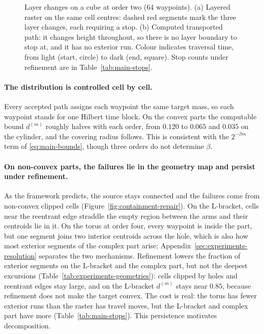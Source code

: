 \begin{figure}[tb]
  \centering
  \caption{Layer changes on a cube at order two (64 waypoints). (a) Layered raster on the same cell centres: dashed red segments mark the three layer changes, each requiring a stop. (b) Computed transported path: it changes height throughout, so there is no layer boundary to stop at, and it has no exterior run. Colour indicates traversal time, from light (start, circle) to dark (end, square). Stop counts under refinement are in Table~\ref{tab:main-stops}.}
  \label{fig:layer-stops}
\end{figure}



\paragraph{The distribution is controlled cell by cell.}
Every accepted path assigns each waypoint the same target mass, so each waypoint stands for one Hilbert time block. On the convex parts the computable bound $d^{(m)}$ roughly halves with each order, from $0.120$ to $0.065$ and $0.035$ on the cylinder, and the covering radius follows. This is consistent with the $2^{-\beta m}$ term of \eqref{eq:main-bounds}, though three orders do not determine $\beta$.

\paragraph{On non-convex parts, the failures lie in the geometry map and persist under refinement.}
As the framework predicts, the source stays connected and the failures come from non-convex clipped cells (Figure~\ref{fig:containment-repair}). On the L-bracket, cells near the reentrant edge straddle the empty region between the arms and their centroids lie in it. On the torus at order four, every waypoint is inside the part, but one segment joins two interior centroids across the hole, which is also how most exterior segments of the complex part arise; Appendix~\ref{sec:experiments-resolution} separates the two mechanisms. Refinement lowers the fraction of exterior segments on the L-bracket and the complex part, but not the deepest excursions (Table~\ref{tab:experiments-geometries}): cells clipped by holes and reentrant edges stay large, and on the L-bracket $d^{(m)}$ stays near $0.85$, because refinement does not make the target convex. The cost is real: the torus has fewer exterior runs than the raster has travel moves, but the L-bracket and complex part have more (Table~\ref{tab:main-stops}). This persistence motivates decomposition.

